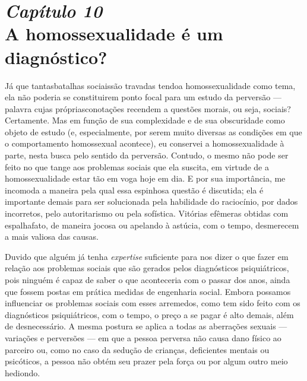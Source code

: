 \chapter[\textbf{10}\quad A homossexualidade é um diagnóstico?]{{\large\textit{Capítulo 10}}\\ A homossexualidade é um diagnóstico?}

Já que tantas\idxhomos[|(] batalhas sociais\idxhomosaspe[|(] são travadas tendo\idxdiag[|(] a homossexualidade
como tema, ela não poderia se constituir\idxaspec[|(] em ponto focal para um estudo
da perversão --- palavra cujas próprias\idxpervaspec[|(] conotações recendem a questões
morais, ou seja, sociais?\idxpervpecad[|(] Certamente. Mas em função de sua complexidade
e de sua obscuridade como objeto de estudo (e, especialmente, por serem
muito diversas as condições em que o comportamento homossexual
acontece), eu conservei a homossexualidade à parte, nesta busca pelo
sentido da perversão. Contudo, o mesmo não pode ser feito no que tange
aos problemas sociais que ela suscita, em virtude de a homossexualidade
estar tão em voga hoje em dia. E por sua importância, me incomoda a
maneira pela qual essa espinhosa questão é discutida; ela é importante
demais para ser solucionada pela habilidade do raciocínio, por dados
incorretos, pelo autoritarismo ou pela sofística. Vitórias efêmeras
obtidas com espalhafato, de maneira jocosa ou apelando à astúcia, com o
tempo, desmerecem a mais valiosa das causas.

Duvido que alguém já tenha \textit{expertise} suficiente para nos
dizer o que fazer em relação aos problemas sociais que são gerados pelos
diagnósticos psiquiátricos, pois ninguém é capaz de saber o que
aconteceria com o passar dos anos, ainda que fossem postas em prática
medidas de engenharia social. Embora possamos influenciar os problemas
sociais com esses arremedos, como tem sido feito com os diagnósticos
psiquiátricos, com o tempo, o preço a se pagar é alto demais, além de
desnecessário. A mesma postura se aplica a todas as aberrações sexuais
 --- variações e perversões --- em que a pessoa perversa não causa
dano físico ao parceiro ou, como no caso da sedução de crianças,\idxpedof{}
deficientes mentais ou psicóticos, a pessoa não obtém seu prazer pela
força ou por algum outro meio hediondo.

